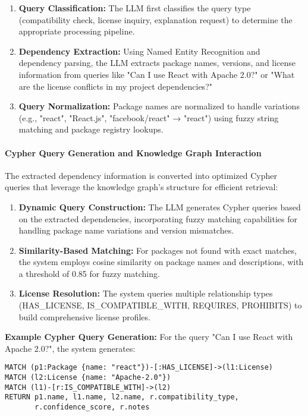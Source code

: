 \begin{enumerate}
    \item \textbf{Query Classification:} The LLM first classifies the query type (compatibility check, license inquiry, explanation request) to determine the appropriate processing pipeline.
    \item \textbf{Dependency Extraction:} Using Named Entity Recognition and dependency parsing, the LLM extracts package names, versions, and license information from queries like "Can I use React with Apache 2.0?" or "What are the license conflicts in my project dependencies?"
    \item \textbf{Query Normalization:} Package names are normalized to handle variations (e.g., "react", "React.js", "facebook/react" → "react") using fuzzy string matching and package registry lookups.
\end{enumerate}

\paragraph{Cypher Query Generation and Knowledge Graph Interaction}
The extracted dependency information is converted into optimized Cypher queries that leverage the knowledge graph's structure for efficient retrieval:

\begin{enumerate}
    \item \textbf{Dynamic Query Construction:} The LLM generates Cypher queries based on the extracted dependencies, incorporating fuzzy matching capabilities for handling package name variations and version mismatches.
    \item \textbf{Similarity-Based Matching:} For packages not found with exact matches, the system employs cosine similarity on package names and descriptions, with a threshold of 0.85 for fuzzy matching.
    \item \textbf{License Resolution:} The system queries multiple relationship types (HAS\_LICENSE, IS\_COMPATIBLE\_WITH, REQUIRES, PROHIBITS) to build comprehensive license profiles.
\end{enumerate}

\textbf{Example Cypher Query Generation:}
For the query "Can I use React with Apache 2.0?", the system generates:

\begin{verbatim}
MATCH (p1:Package {name: "react"})-[:HAS_LICENSE]->(l1:License)
MATCH (l2:License {name: "Apache-2.0"})
MATCH (l1)-[r:IS_COMPATIBLE_WITH]->(l2)
RETURN p1.name, l1.name, l2.name, r.compatibility_type, 
       r.confidence_score, r.notes
\end{verbatim}

